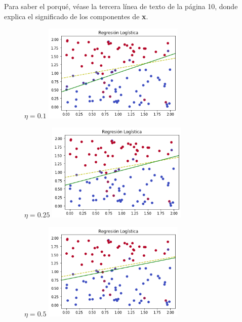\documentclass{article}
\begin{document}
    Para saber el porqué, véase la tercera línea de texto de la página 10, donde explica el
    significado de los componentes de \textbf{x}.

    \begin{figure}
        \centering
        $\eta = 0.1$
        \includegraphics[width=0.6\textwidth]{rl1.png}
    \end{figure}

    \begin{figure}
        \centering
        $\eta = 0.25$
        \includegraphics[width=0.6\textwidth]{rl2.png}
    \end{figure}

    \begin{figure}
        \centering
        $\eta = 0.5$
        \includegraphics[width=0.6\textwidth]{rl3.png}
    \end{figure}
\end{document}
